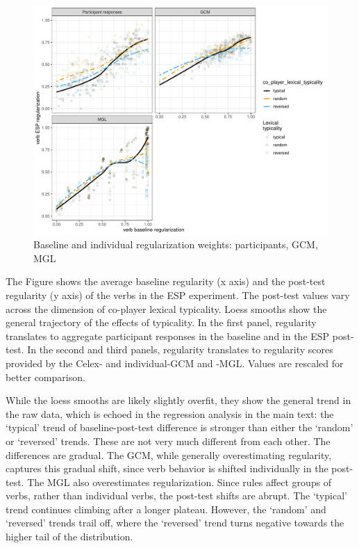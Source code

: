 \documentclass[12pt]{article}
\begin{document}
\begin{figure}
\centering
\includegraphics[width = \textwidth]{si_figure.pdf}
\caption{Baseline and individual regularization weights: participants, GCM, MGL}
\label{bigfigure}
\end{figure}

The Figure shows the average baseline regularity (x axis) and the post-test regularity (y axis) of the verbs in the ESP experiment. The post-test values vary across the dimension of co-player lexical typicality. Loess smooths show the general trajectory of the effects of typicality. In the first panel, regularity translates to aggregate participant responses in the baseline and in the ESP post-test. In the second and third panels, regularity translates to regularity scores provided by the {\sc Celex}- and individual-GCM and -MGL. Values are rescaled for better comparison.

While the loess smooths are likely slightly overfit, they show the general trend in the raw data, which is echoed in the regression analysis in the main text: the `typical' trend of baseline-post-test difference is stronger than either the `random' or `reversed' trends. These are not very much different from each other. The differences are gradual. The GCM, while generally overestimating regularity, captures this gradual shift, since verb behavior is shifted individually in the post-test. The MGL also overestimates regularization. Since rules affect groups of verbs, rather than individual verbs, the post-test shifts are abrupt. The `typical' trend continues climbing after a longer plateau. However, the `random' and `reversed' trends trail off, where the `reversed' trend turns negative towards the higher tail of the distribution.


\newpage



\end{document}
